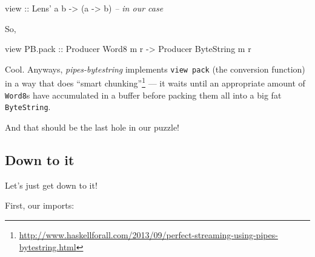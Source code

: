 \documentclass[]{article}
\newenvironment{Shaded}{}{}
\newcommand{\CommentTok}[1]{\textcolor[rgb]{0.38,0.63,0.69}{\textit{#1}}}
\newcommand{\DataTypeTok}[1]{\textcolor[rgb]{0.56,0.13,0.00}{#1}}
\newcommand{\NormalTok}[1]{#1}
\newcommand{\OtherTok}[1]{\textcolor[rgb]{0.00,0.44,0.13}{#1}}
\renewcommand{\href}[2]{#2\footnote{\url{#1}}}
\begin{document}
\begin{Shaded}
\begin{Highlighting}[]
\OtherTok{view ::} \DataTypeTok{Lens'}\NormalTok{ a b }\OtherTok{->}\NormalTok{ (a }\OtherTok{->}\NormalTok{ b)       }\CommentTok{-- in our case}
\end{Highlighting}
\end{Shaded}

So,

\begin{Shaded}
\begin{Highlighting}[]
\NormalTok{view PB.pack}\OtherTok{ ::} \DataTypeTok{Producer} \DataTypeTok{Word8}\NormalTok{      m r}
             \OtherTok{->} \DataTypeTok{Producer} \DataTypeTok{ByteString}\NormalTok{ m r}
\end{Highlighting}
\end{Shaded}

Cool. Anyways, \emph{pipes-bytestring} implements \texttt{view\ pack} (the
conversion function) in a way that does
\href{http://www.haskellforall.com/2013/09/perfect-streaming-using-pipes-bytestring.html}{``smart
chunking''} --- it waits until an appropriate amount of \texttt{Word8}s have
accumulated in a buffer before packing them all into a big fat
\texttt{ByteString}.

And that should be the last hole in our puzzle!

\hypertarget{down-to-it}{%
\subsection{Down to it}\label{down-to-it}}

Let's just get down to it!

First, our imports:
\end{document}
